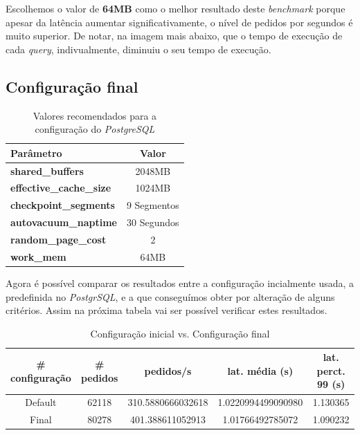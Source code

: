 Escolhemos o valor de \textbf{64MB} como o melhor resultado deste \textit{benchmark} porque apesar da latência aumentar significativamente, o nível de pedidos por segundos é muito superior. De notar, na imagem mais abaixo, que o tempo de execução de cada \textit{query}, indivualmente, diminuiu o seu tempo de execução.

\subsection{Configuração final}

\begin{table}[!h]
\center
\small
\begin{tabular}{|l|c|}
\hline
\textbf{Parâmetro} & \textbf{Valor} \\ \hline
\textbf{shared\_buffers} & 2048MB  \\ \hline
\textbf{effective\_cache\_size} & 1024MB  \\ \hline
\textbf{checkpoint\_segments} & 9 Segmentos \\ \hline
\textbf{autovacuum\_naptime} & 30 Segundos \\ \hline
\textbf{random\_page\_cost} & 2 \\ \hline
\textbf{work\_mem} & 64MB \\ \hline
\end{tabular}
\caption{Valores recomendados para a configuração do \textit{PostgreSQL}}
\end{table}

Agora é possível comparar os resultados entre a configuração incialmente usada, a predefinida no \textit{PostgrSQL}, e a que conseguímos obter por alteração de alguns critérios. Assim na próxima tabela vai ser possível verificar estes resultados.

\begin{table}[!h]
\center
\small
\begin{tabular}{|c|c|c|c|c|}
\hline
\textbf{\# configuração} & \textbf{\# pedidos} & \textbf{pedidos/s} & \textbf{lat. média (s)} & \textbf{lat. perct. 99 (s)}  \\ \hline
Default & 62118 & 310.5880666032618 & 1.0220994499090980 & 1.130365  \\ \hline
Final & 80278 & 401.388611052913 & 1.01766492785072 & 1.090232  \\ \hline
\end{tabular}
\caption{Configuração inicial vs. Configuração final}
\end{table}

